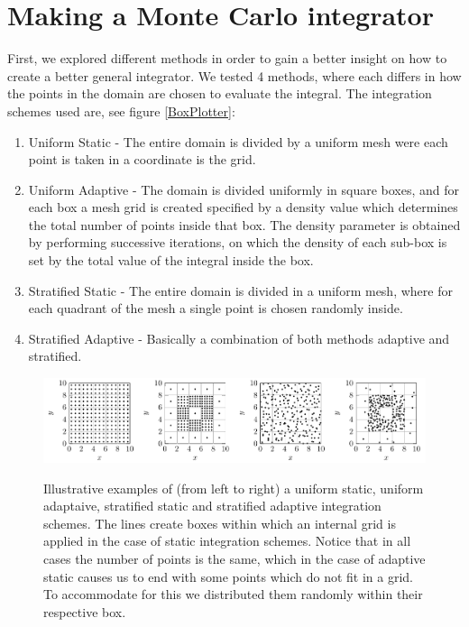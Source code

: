 \section{Making a Monte Carlo integrator}


First, we explored different methods
in order to gain a better insight on how to create a better general integrator. We tested 4 methods, where each differs in how
the points in the domain are chosen to evaluate the integral.
The integration schemes \cite{MCmethods} used are, see figure \ref{BoxPlotter}:
\begin{enumerate}
  \item Uniform Static - The entire domain is divided by a uniform mesh were each point is taken in a coordinate is the grid.
  \item Uniform Adaptive - The domain is divided uniformly in square boxes, and for each box a mesh grid is created
  specified by a density value which determines the total number of points inside that box. The density parameter
  is obtained by performing successive iterations, on which the density of each sub-box is set by the total value of the integral inside
  the box.
  \item Stratified Static - The entire domain is divided in a uniform mesh, where for each quadrant of the mesh
  a single point is chosen randomly inside.
  \item Stratified Adaptive - Basically a combination of both methods adaptive and stratified.
\end{enumerate}


\begin{figure}[ht]
  \begin{center}
  \includegraphics[scale=1 ]{graphs/BoxPlotter.pdf}\label{BoxPlotter}
  \caption{Illustrative examples of (from left to right) a uniform static, uniform adaptaive, stratified static and stratified adaptive integration schemes. The lines create boxes within which an internal grid is applied in the case of static integration schemes. Notice that in all cases the number of points is the same, which in the case of adaptive static causes us to end with some points which do not fit in a grid. To accommodate for this we distributed them randomly within their respective box. }
  \label{fig:int}
  \end{center}
\end{figure}

